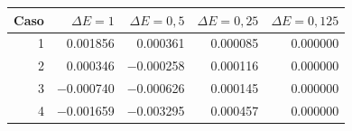 \begin{tabular}{rrrrr}\toprule
Caso & $\Delta E=1$ & $\Delta E=0{,}5$ & $\Delta E=0{,}25$ & $\Delta E=0{,}125$\\\midrule
1 & \num{0.001856} & \num{0.000361} & \num{0.000085} & \num{0.000000}\\
2 & \num{0.000346} & \num{-0.000258} & \num{0.000116} & \num{0.000000}\\
3 & \num{-0.000740} & \num{-0.000626} & \num{0.000145} & \num{0.000000}\\
4 & \num{-0.001659} & \num{-0.003295} & \num{0.000457} & \num{0.000000}\\
\bottomrule\end{tabular}